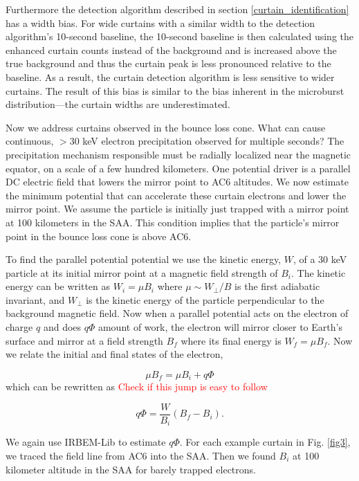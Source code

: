 \documentclass[draft]{agujournal2019}
\begin{document}
Furthermore the detection algorithm described in section \ref{curtain_identification} has a width bias. For wide curtains with a similar width to the detection algorithm's 10-second baseline, the 10-second baseline is then calculated using the enhanced curtain counts instead of the background and is increased above the true background and thus the curtain peak is less pronounced relative to the baseline. As a result, the curtain detection algorithm is less sensitive to wider curtains. The result of this bias is similar to the bias inherent in the microburst distribution---the curtain widths are underestimated.

Now we address curtains observed in the bounce loss cone. What can cause continuous, $>30$ keV electron precipitation observed for multiple seconds? The precipitation mechanism responsible must be radially localized near the magnetic equator, on a scale of a few hundred kilometers. One potential driver is a parallel DC electric field that lowers the mirror point to AC6 altitudes. We now estimate the minimum potential that can accelerate these curtain electrons and lower the mirror point. We assume the particle is initially just trapped with a mirror point at 100 kilometers in the SAA. This condition implies that the particle's mirror point in the bounce loss cone is above AC6. 

To find the parallel potential potential we use the kinetic energy, $W$, of a $30$ keV particle at its initial mirror point at a magnetic field strength of $B_i$. The kinetic energy can be written as $W_i = \mu B_i$ where $\mu \sim W_\perp / B$ is the first adiabatic invariant, and $W_{\perp}$ is the kinetic energy of the particle perpendicular to the background magnetic field. Now when a parallel potential acts on the electron of charge $q$ and does $q \Phi$ amount of work, the electron will mirror closer to Earth's surface and mirror at a field strength $B_f$ where its final energy is $W_f = \mu B_f$. Now we relate the initial and final states of the electron,

\begin{equation}
\mu B_f = \mu B_i + q \Phi
\end{equation} which can be rewritten as \textcolor{red}{Check if this jump is easy to follow}

\begin{equation}
 q \Phi = \frac{W}{B_i}(B_f - B_i).
\end{equation}

We again use IRBEM-Lib to estimate $ q \Phi$. For each example curtain in Fig. \ref{fig3}, we traced the field line from AC6 into the SAA. Then we found $B_i$ at 100 kilometer altitude in the SAA for barely trapped electrons.
\end{document}
